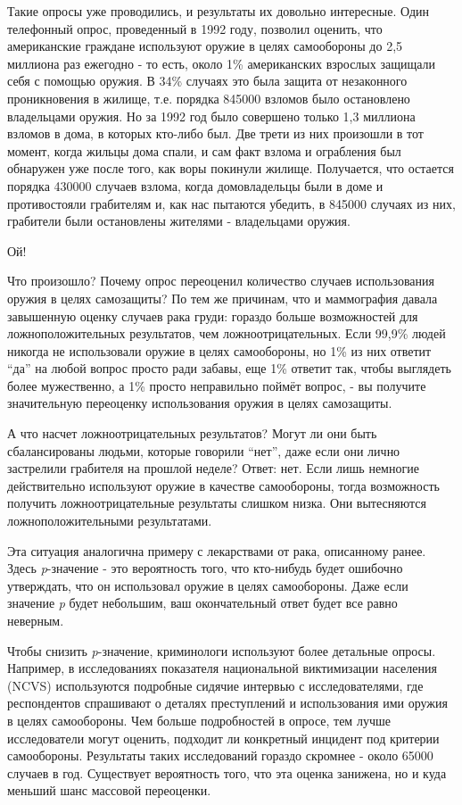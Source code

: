 Такие опросы уже проводились, и результаты их довольно интересные. Один телефонный опрос, проведенный в 1992 году, позволил оценить, что американские граждане используют оружие в целях самообороны до 2,5 миллиона раз ежегодно - то есть, около 1\% американских взрослых защищали себя с помощью оружия. В 34\% случаях это была защита от незаконного проникновения в жилище, т.е. порядка 845000 взломов было остановлено владельцами оружия. Но за 1992 год было совершено только 1,3 миллиона взломов в дома, в которых кто-либо был. Две трети из них произошли в тот момент, когда жильцы дома спали, и сам факт взлома и ограбления был обнаружен уже после того, как воры покинули жилище. Получается, что остается порядка 430000 случаев взлома, когда домовладельцы были в доме и противостояли грабителям и, как нас пытаются убедить, в 845000 случаях из них, грабители были остановлены жителями - владельцами оружия.\cite{hemenway_survey_1996}   


Ой!


Что произошло? Почему опрос переоценил количество случаев использования оружия в целях самозащиты? По тем же причинам, что и маммография давала завышенную оценку случаев рака груди: гораздо больше возможностей для ложноположительных результатов, чем ложноотрицательных. Если 99,9\% людей никогда не использовали оружие в целях самообороны, но 1\% из них ответит ``да'' на любой вопрос просто ради забавы, еще 1\% ответит так, чтобы выглядеть более мужественно, а 1\% просто неправильно поймёт вопрос, - вы получите значительную переоценку использования оружия в целях самозащиты.

А что насчет ложноотрицательных результатов? Могут ли они быть сбалансированы людьми, которые говорили ``нет'', даже если они лично застрелили грабителя на прошлой неделе? Ответ: нет. Если лишь немногие действительно используют оружие в качестве самообороны, тогда возможность получить ложноотрицательные результаты слишком низка. Они вытесняются ложноположительными результатами.

Эта ситуация аналогична примеру с лекарствами от рака, описанному ранее. Здесь \emph{p}-значение - это вероятность того, что кто-нибудь будет ошибочно утверждать, что он использовал оружие в целях самообороны. Даже если значение \emph{p} будет небольшим, ваш окончательный ответ будет все равно неверным. 


Чтобы снизить \emph{p}-значение, криминологи используют более детальные опросы. Например, в исследованиях показателя национальной виктимизации населения (NCVS) используются подробные сидячие интервью с исследователями, где респондентов спрашивают о деталях преступлений и использования ими оружия в целях самообороны. Чем больше подробностей в опросе, тем лучше исследователи могут оценить, подходит ли конкретный инцидент под критерии самообороны. Результаты таких исследований гораздо скромнее - около 65000 случаев в год. Существует вероятность того, что эта оценка занижена, но и куда меньший шанс массовой переоценки.     



